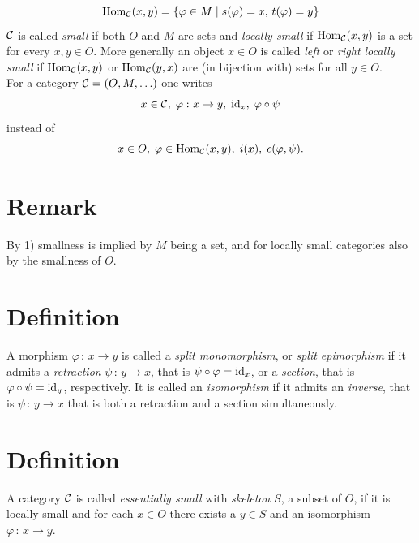         \begin{equation*}
            \operatorname{Hom}_{\mathcal{C}}(x, y) = \left\{ \varphi \in M \mid s(\varphi) = x, \, t(\varphi) = y \right\}
        \end{equation*}
        $\mathcal{C}$ is called \emph{small} if both $O$ and $M$ are sets and \emph{locally small} if $\operatorname{Hom}_{\mathcal{C}}(x, y)$ is a set for every $x, y \in O$. More generally an object $x \in O$ is called \emph{left} or \emph{right locally small} if $\operatorname{Hom}_{\mathcal{C}}(x, y)$ or $\operatorname{Hom}_{\mathcal{C}}(y, x)$ are (in bijection with) sets for all $y \in O$. \\
        For a category $\mathcal{C} = \left(O, M, \ldots \right)$ one writes
        \begin{equation*}
            x \in \mathcal{C}, \; \varphi \,\colon x \to y, \; \operatorname{id}_x, \; \varphi \circ \psi
        \end{equation*}
        instead of
        \begin{equation*}
            x \in O, \; \varphi \in \operatorname{Hom}_{\mathcal{C}}(x, y), \; i(x), \; c(\varphi, \psi).
        \end{equation*}
    \section{Remark}
        By 1) smallness is implied by $M$ being a set, and for locally small categories also by the smallness of $O$.
    \section{Definition}
        A morphism $\varphi \,\colon\, x \to y$ is called a \emph{split monomorphism}, or \emph{split epimorphism} if it admits a \emph{retraction} $\psi \,\colon\, y \to x$, that is $\psi \circ \varphi = \operatorname{id}_x$, or a \emph{section}, that is $\varphi \circ \psi = \operatorname{id}_y$, respectively. It is called an \emph{isomorphism} if it admits an \emph{inverse}, that is $\psi \,\colon\, y \to x$ that is both a retraction and a section simultaneously.
    \section{Definition}
        A category $\mathcal{C}$ is called \emph{essentially small} with \emph{skeleton} $S$, a subset of $O$, if it is locally small and for each $x \in O$ there exists a $y \in S$ and an isomorphism $\varphi \,\colon\, x \to y$.
